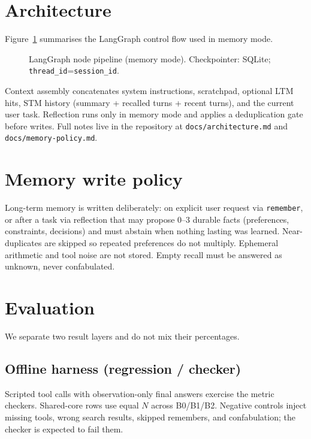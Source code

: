 \documentclass[11pt,a4paper]{article}
\begin{document}
\section{Architecture}

Figure~\ref{fig:arch} summarises the LangGraph control flow used in memory mode.

\begin{figure}[ht]
\centering
{}
\caption{LangGraph node pipeline (memory mode). Checkpointer: SQLite; \texttt{thread\_id}=\texttt{session\_id}.}
\label{fig:arch}
\end{figure}

Context assembly concatenates system instructions, scratchpad, optional LTM hits, STM history (summary + recalled turns + recent turns), and the current user task. Reflection runs only in memory mode and applies a deduplication gate before writes. Full notes live in the repository at \texttt{docs/architecture.md} and \texttt{docs/memory-policy.md}.

\section{Memory write policy}

Long-term memory is written deliberately: on explicit user request via \texttt{remember}, or after a task via reflection that may propose 0--3 durable facts (preferences, constraints, decisions) and must abstain when nothing lasting was learned. Near-duplicates are skipped so repeated preferences do not multiply. Ephemeral arithmetic and tool noise are not stored. Empty recall must be answered as unknown, never confabulated.

\section{Evaluation}

We separate two result layers and do not mix their percentages.

\subsection{Offline harness (regression / checker)}

Scripted tool calls with observation-only final answers exercise the metric checkers. Shared-core rows use equal \(N\) across B0/B1/B2. Negative controls inject missing tools, wrong search results, skipped remembers, and confabulation; the checker is expected to fail them.
\end{document}
